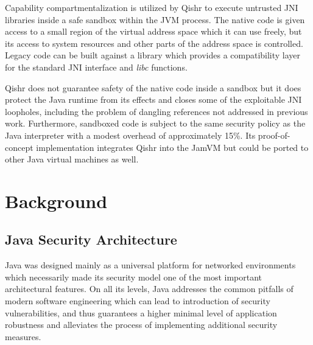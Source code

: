 \documentclass[a4paper,12pt,twoside,openright]{report}
\newcommand{\tool}[1]{\emph{#1}}
\newcommand{\lib}[1]{\tool{lib#1}}
\begin{document}
Capability compartmentalization is utilized by Qishr to execute untrusted JNI libraries inside a safe sandbox within the JVM process. The native code is given access to a small region of the virtual address space which it can use freely, but its access to system resources and other parts of the address space is controlled. Legacy code can be built against a library which provides a compatibility layer for the standard JNI interface and \lib{c} functions.

Qishr does not guarantee safety of the native code inside a sandbox but it does protect the Java runtime from its effects and closes some of the exploitable JNI loopholes, including the problem of dangling references not addressed in previous work. Furthermore, sandboxed code is subject to the same security policy as the Java interpreter
 with a modest overhead of approximately 15\%. Its proof-of-concept implementation integrates Qishr into the JamVM but could be ported to other Java virtual machines as well. 

\chapter{Background} 

% 

\section{Java Security Architecture}

Java was designed mainly as a universal platform for networked environments which necessarily made its security model one of the most important architectural features. On all its levels, Java addresses the common pitfalls of modern software engineering which can lead to introduction of security vulnerabilities, and thus guarantees a higher minimal level of application robustness and alleviates the process of implementing additional security measures.
\end{document}
